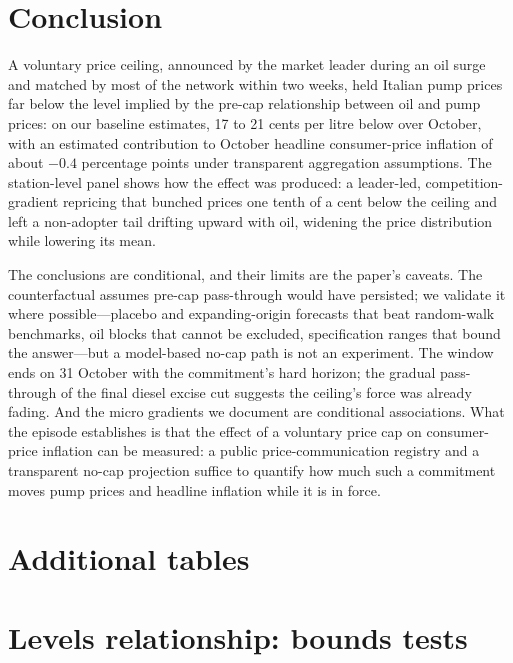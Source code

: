 \documentclass[11pt]{article}
\begin{document}


\section{Conclusion}\label{sec:conclusion}

A voluntary price ceiling, announced by the market leader during an oil
surge and matched by most of the network within two weeks, held Italian
pump prices far below the level implied by the pre-cap relationship
between oil and pump prices: on our baseline estimates, 17 to 21 cents
per litre below over October, with an estimated contribution to October
headline consumer-price inflation of about $-0.4$ percentage points
under transparent aggregation assumptions. The station-level panel shows
how the effect was produced: a leader-led, competition-gradient repricing
that bunched prices one tenth of a cent below the ceiling and left a
non-adopter tail drifting upward with oil, widening the price
distribution while lowering its mean.

The conclusions are conditional, and their limits are the paper's
caveats. The counterfactual assumes pre-cap pass-through would have
persisted; we validate it where possible---placebo and
expanding-origin forecasts that beat random-walk benchmarks, oil blocks
that cannot be excluded, specification ranges that bound the
answer---but a model-based no-cap path is not an experiment. The window
ends on 31 October with the commitment's hard horizon; the gradual
pass-through of the final diesel excise cut suggests the ceiling's force
was already fading. And the micro gradients we document are conditional
associations. What the episode establishes is that the effect of a
voluntary price cap on consumer-price inflation can be measured: a
public price-communication registry and a transparent no-cap projection
suffice to quantify how much such a commitment moves pump prices and
headline inflation while it is in force.

\clearpage
\appendix

\section{Additional tables}\label{app:tables}



\section{Levels relationship: bounds tests}\label{app:ecm}
\end{document}
